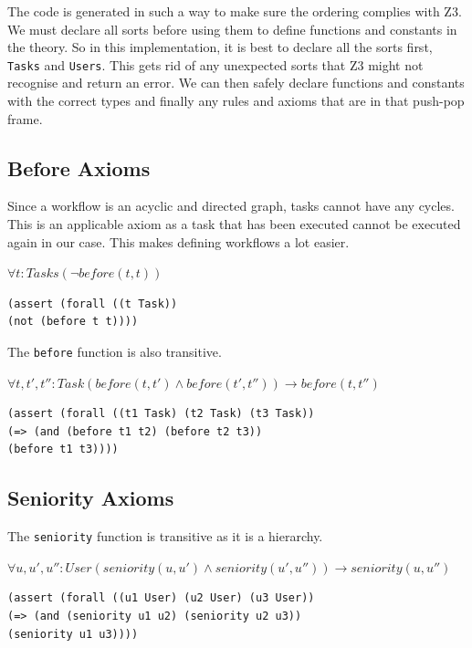\documentclass[a4paper]{report}
\begin{document}
The code is generated in such a way to make sure the ordering complies with Z3. We must declare all sorts before using them to define functions and constants in the theory. So in this implementation, it is best to declare all the sorts first, \texttt{Tasks} and \texttt{Users}. This gets rid of any unexpected sorts that Z3 might not recognise and return an error. We can then safely declare functions and constants with the correct types and finally any rules and axioms that are in that push-pop frame.

\subsection{Before Axioms}
Since a workflow is an acyclic and directed graph, tasks cannot have any cycles. This is an applicable axiom as a task that has been executed cannot be executed again in our case. This makes defining workflows a lot easier. 
\begin{center}
$\forall t : Tasks (\neg before(t, t))$
\end{center}
\begin{lstlisting}[frame=single]
(assert (forall ((t Task))
(not (before t t))))
\end{lstlisting}

The \texttt{before} function is also transitive. 

\begin{center}
$\forall t, t\ensuremath{'}, t\ensuremath{''}  : Task (before(t, t\ensuremath{'}) \wedge before(t\ensuremath{'}, t\ensuremath{''})) \longrightarrow before(t, t\ensuremath{''})$
\end{center}

\begin{lstlisting}[frame=single]
(assert (forall ((t1 Task) (t2 Task) (t3 Task))
(=> (and (before t1 t2) (before t2 t3))
(before t1 t3))))
\end{lstlisting}

\subsection{Seniority Axioms}
The \texttt{seniority} function is transitive as it is a hierarchy.\\
\begin{center}
$\forall u, u\ensuremath{'}, u\ensuremath{''}  : User (seniority(u, u\ensuremath{'}) \wedge seniority(u\ensuremath{'}, u\ensuremath{''})) \longrightarrow seniority(u, u\ensuremath{''})$
\end{center}
\begin{lstlisting}[frame=single]
(assert (forall ((u1 User) (u2 User) (u3 User)) 
(=> (and (seniority u1 u2) (seniority u2 u3)) 
(seniority u1 u3))))
\end{lstlisting} 
\end{document}
